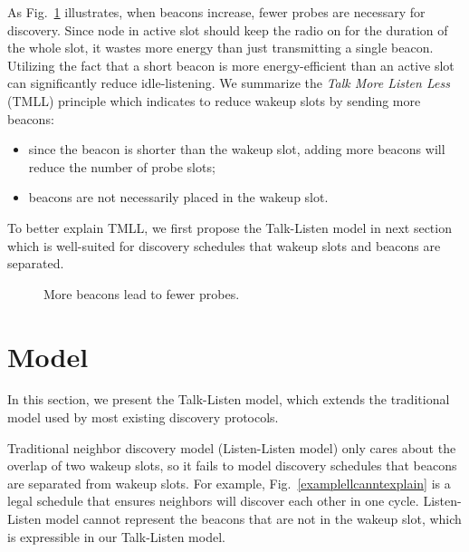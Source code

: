 \documentclass[conference]{IEEEtran}
\begin{document}
As Fig.~\ref{morebeaconlessprobe} illustrates, when beacons increase, fewer probes are necessary for discovery.
Since node in active slot should keep the radio on for the duration of the whole slot, it wastes more energy than just transmitting a single beacon.
Utilizing the fact that a short beacon is more energy-efficient than an active slot can significantly reduce idle-listening.
We summarize the \emph{Talk More Listen Less} (TMLL) principle which indicates to reduce wakeup slots by sending more beacons:

\begin{itemize}
    \item since the beacon is shorter than the wakeup slot, adding more beacons will reduce the number of probe slots;
    \item beacons are not necessarily placed in the wakeup slot.
\end{itemize}

To better explain TMLL, we first propose the Talk-Listen model in next section which is well-suited for discovery schedules that wakeup slots and beacons are separated.

\begin{figure}[t]
    \centering

    \hspace{1em}
    \hspace{1em}
    \caption{More beacons lead to fewer probes.}\label{morebeaconlessprobe}
\end{figure}


\section{Model}\label{model}
In this section, we present the Talk-Listen model, which extends the traditional model used by most existing discovery protocols.

Traditional neighbor discovery model (Listen-Listen model) only cares about the overlap of two wakeup slots, so it fails to model discovery schedules that beacons are separated from wakeup slots.
For example, Fig.~\ref{examplellcanntexplain} is a legal schedule that ensures neighbors will discover each other in one cycle.
Listen-Listen model cannot represent the beacons that are not in the wakeup slot, which is expressible in our Talk-Listen model.
\end{document}
